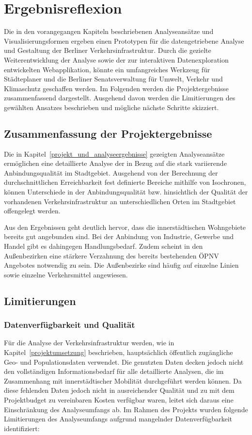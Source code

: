\newpage


\section{Ergebnisreflexion}
\label{ergebnisreflexion}

Die in den vorangegangen Kapiteln beschriebenen Analyseansätze und Visualisierungsformen ergeben einen Prototypen für die datengetriebene Analyse und Gestaltung der Berliner Verkehrsinfrastruktur. Durch die gezielte Weiterentwicklung der Analyse sowie der zur interaktiven Datenexploration entwickelten Webapplikation, könnte ein umfangreiches Werkzeug für Städteplaner und die Berliner Senatsverwaltung für Umwelt, Verkehr und Klimaschutz geschaffen werden. Im Folgenden werden die Projektergebnisse zusammenfassend dargestellt. Ausgehend davon werden die Limitierungen des gewählten Ansatzes beschrieben und mögliche nächste Schritte skizziert.

\subsection{Zusammenfassung der Projektergebnisse}
Die in Kapitel~\ref{projekt_und_analyseergebnisse} gezeigten Analyseansätze ermöglichen eine detaillierte Analyse der in Bezug auf die stark variierende Anbindungsqualität im Stadtgebiet. Ausgehend von der Berechnung der durchschnittlichen Erreichbarkeit fest definierte Bereiche mithilfe von Isochronen, können Unterschiede in der Anbindungsqualität bzw. hinsichtlich der Qualität der vorhandenen Verkehrsinfrastruktur an unterschiedlichen Orten im Stadtgebiet offengelegt werden.

Aus den Ergebnissen geht deutlich hervor, dass die innerstädtischen Wohngebiete bereits gut angebunden sind. Bei der Anbindung von Industrie, Gewerbe und Handel gibt es dahingegen Handlungsbedarf. Zudem scheint in den Außenbezirken eine stärkere Verzahnung des bereits bestehenden ÖPNV Angebotes notwendig zu sein. Die Außenbezirke sind häufig auf einzelne Linien sowie einzelne Verkehrsmittel angewiesen.

\subsection{Limitierungen}\label{limitierung}

\subsubsection{Datenverfügbarkeit und Qualität}
Für die Analyse der Verkehrsinfrastruktur werden, wie in Kapitel~\ref{projektumsetzung} beschrieben, hauptsächlich öffentlich zugängliche Geo- und Populationsdaten verwendet. Die genutzten Daten decken jedoch nicht den vollständigen Informationsbedarf für alle detaillierte Analysen, die im Zusammenhang mit innerstädtischer Mobilität durchgeführt werden können. Da diese fehlenden Daten jedoch nicht in ausreichender Qualität und zu mit dem Projektbudget zu vereinbaren Kosten verfügbar waren, leitet sich daraus eine Einschränkung des Analyseumfangs ab. Im Rahmen des Projekts wurden folgende Limitierungen des Analyseumfangs aufgrund mangelnder Datenverfügbarkeit identifiziert:

